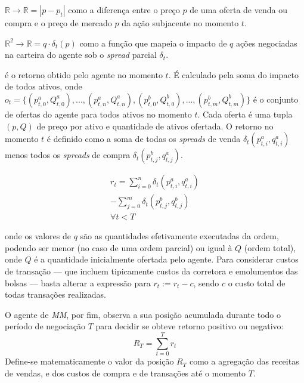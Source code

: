 \begin{description}[]
	\item[$\delta_{t}(p)$:] $\mathbb{R} \rightarrow \mathbb{R} = |p - p_{t}|$ como a diferença entre o preço $p$ de uma oferta de venda ou compra e o preço de mercado $p$ da ação subjacente no momento $t$.
	
	\item[$\delta_{t}(p, q)$:] $\mathbb{R}^{2} \rightarrow \mathbb{R} = q \cdot \delta_{t}(p)$ como a função que mapeia o impacto de $q$ ações negociadas na carteira do agente sob o \textit{spread} parcial $\delta_t$.
	
	\item[$r_{t}$] é o retorno obtido pelo agente no momento $t$. É calculado pela soma do impacto de todos ativos, onde $o_{t} = \{(p_{t, 0}^{a}, Q_{t, 0}^{a}), ..., (p_{t, n}^{a}, Q_{t, n}^{a}), (p_{t, 0}^{b}, Q_{t, 0}^{b}), ..., (p_{t, m}^{b}, Q_{t, m}^{b})\}$ é o conjunto de ofertas do agente para todos ativos no momento $t$. Cada oferta é uma tupla $(p, Q)$ de preço por ativo e quantidade de ativos ofertada. O retorno no momento $t$ é definido como a soma de todas os \textit{spreads} de venda $\delta_{t}(p^{a}_{t, i}, q^{a}_{t, i})$ menos todos os \textit{spreads} de compra $\delta_{t}(p^{b}_{t, j}, q^{a}_{t, j})$.
	
	\begin{equation} \label{return}
		\begin{aligned}
			r_{t} = \sum_{i = 0}^{n} \delta_{t}(p_{t, i}^{a}, q_{t, i}^{a}) \\
			-\sum_{j = 0}^{m} \delta_{t}(p_{t, j}^{b}, q_{t, j}^{b}) \\
			\forall t < T
		\end{aligned}
	\end{equation}
\end{description}

onde os valores de  $q$ são as quantidades efetivamente executadas da ordem, podendo ser menor (no caso de uma ordem parcial) ou igual à $Q$ (ordem total), onde $Q$ é a quantidade inicialmente ofertada pelo agente.
Para considerar custos de transação — que incluem tipicamente custos da corretora e emolumentos das bolsas — basta alterar a expressão para $r_{t} := r_{t} - c$, sendo $c$ o custo total de todas transações realizadas.

O agente de \textit{MM}, por fim, observa a sua posição acumulada durante todo o período de negociação $T$ para decidir se obteve retorno positivo ou negativo:
\begin{equation} \label{return_accumulated}
    R_{T} = \sum_{t=0}^{T} r_t
\end{equation}
Define-se matematicamente o valor da posição $R_T$ como a agregação das receitas de vendas, e dos custos de compra e de transações até o momento $T$. 
